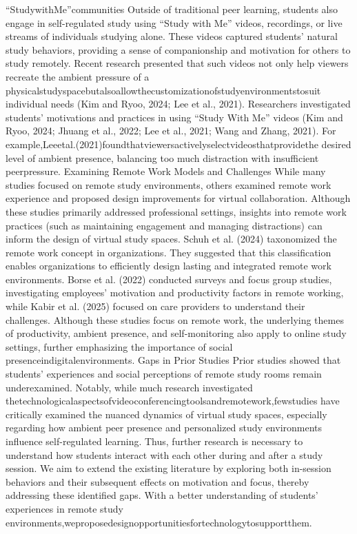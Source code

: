 \documentclass[12pt]{ctexart}
\begin{document}
“StudywithMe”communities
Outside of traditional peer learning, students also engage in self-regulated study
using “Study with Me” videos, recordings, or live streams of individuals studying
alone. These videos captured students’ natural study behaviors, providing a sense
of companionship and motivation for others to study remotely. Recent research
presented that such videos not only help viewers recreate the ambient pressure of a
physicalstudyspacebutalsoallowthecustomizationofstudyenvironmentstosuit
individual needs (Kim and Ryoo, 2024; Lee et al., 2021). Researchers investigated
students’ motivations and practices in using “Study With Me” videos (Kim and
Ryoo, 2024; Jhuang et al., 2022; Lee et al., 2021; Wang and Zhang, 2021). For
example,Leeetal.(2021)foundthatviewersactivelyselectvideosthatprovidethe
desired level of ambient presence, balancing too much distraction with insufficient
peerpressure.
Examining Remote Work Models and Challenges
While many studies focused on remote study environments, others examined
remote work experience and proposed design improvements for virtual
collaboration. Although these studies primarily addressed professional settings,
insights into remote work practices (such as maintaining engagement and
managing distractions) can inform the design of virtual study spaces. Schuh et al.
(2024) taxonomized the remote work concept in organizations. They suggested
that this classification enables organizations to efficiently design lasting and
integrated remote work environments. Borse et al. (2022) conducted surveys and
focus group studies, investigating employees’ motivation and productivity factors
in remote working, while Kabir et al. (2025) focused on care providers to
understand their challenges. Although these studies focus on remote work, the
underlying themes of productivity, ambient presence, and self-monitoring also
apply to online study settings, further emphasizing the importance of social
presenceindigitalenvironments.
Gaps in Prior Studies
Prior studies showed that students’ experiences and social perceptions of remote
study rooms remain underexamined. Notably, while much research investigated
thetechnologicalaspectsofvideoconferencingtoolsandremotework,fewstudies
have critically examined the nuanced dynamics of virtual study spaces, especially
regarding how ambient peer presence and personalized study environments
influence self-regulated learning. Thus, further research is necessary to understand
how students interact with each other during and after a study session. We aim to
extend the existing literature by exploring both in-session behaviors and their
subsequent effects on motivation and focus, thereby addressing these identified
gaps. With a better understanding of students’ experiences in remote study
environments,weproposedesignopportunitiesfortechnologytosupportthem.
\end{document}
